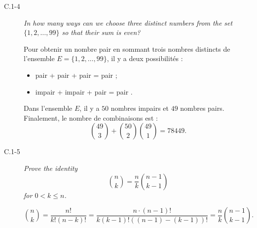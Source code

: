 \begin{description}
  \item[C.1-4] {\itshape In how many ways can we choose three distinct numbers from the set $\{1, 2,\ldots, 99\}$ so that their sum is even?}
    \begin{ex}
      Pour obtenir un nombre pair en sommant trois nombres distincts de l'ensemble $E = \{1, 2, \ldots, 99\}$, il y a deux possibilit\'es :
      \begin{itemize}
        \item pair + pair + pair = pair ;
        \item impair + impair + pair = pair .
      \end{itemize}
      Dans l'ensemble $E$, il y a $50$ nombres impairs et $49$ nombres pairs. Finalement, le nombre de combinaisons est :
      \[ \binom{49}{3} + \binom{50}{2}\binom{49}{1} = 78449.  \]
      
    \end{ex}
  \item[C.1-5] {\itshape Prove the identity \[\binom{n}{k} = \frac{n}{k}\binom{n-1}{k-1}\] for $ 0 < k \le n$.}

    \begin{ex}
      \[ \binom{n}{k} = \frac{n!}{k!(n-k)!} = \frac{n\cdot(n-1)!}{k(k-1)!((n-1)-(k-1))!} = \frac{n}{k}\binom{n-1}{k-1}.\]
    \end{ex}


\end{description}
